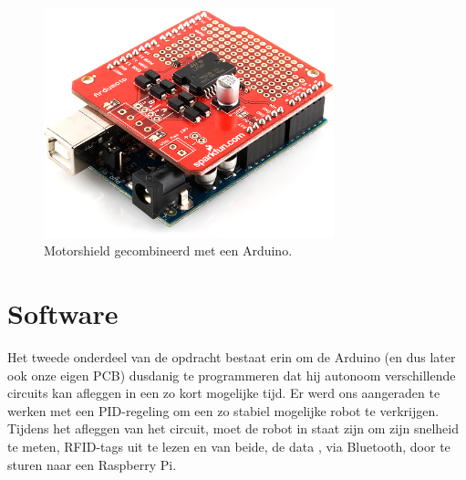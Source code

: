 \begin{figure}[H]
\centering
\includegraphics[width=0.75\textwidth]{ArduMoto.png}
\caption{Motorshield gecombineerd met een Arduino. \label{fig:ArduMoto}}
\end{figure}

\section{Software}
Het tweede onderdeel van de opdracht bestaat erin om de Arduino (en dus later ook onze eigen PCB) dusdanig te programmeren dat hij autonoom verschillende circuits kan afleggen in een zo kort mogelijke tijd. Er werd ons aangeraden te werken met een PID-regeling om een zo stabiel mogelijke robot te verkrijgen. Tijdens het afleggen van het circuit, moet de robot in staat zijn om zijn snelheid te meten, RFID-tags uit te lezen en van beide, de data , via Bluetooth, door te sturen naar een Raspberry Pi.
 



